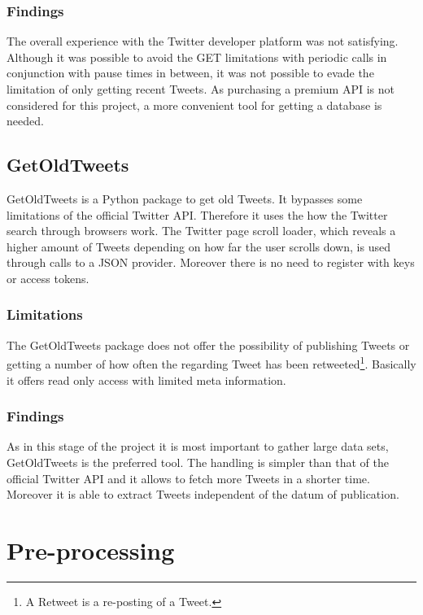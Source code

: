 \documentclass[conference]{IEEEtran}
\begin{document}
\subsubsection{Findings}

The overall experience with the Twitter developer platform was not satisfying. Although it was possible to avoid the GET limitations with periodic calls in conjunction with pause times in between, it was not possible to evade the limitation of only getting recent Tweets. As purchasing a premium API is not considered for this project, a more convenient tool for getting a database is needed.

\subsection{GetOldTweets}\label{subsec_got}

GetOldTweets \cite{got} is a Python package to get old Tweets. It bypasses some limitations of the official Twitter API. Therefore it uses the how the Twitter search through browsers work. The Twitter page scroll loader, which reveals a higher amount of Tweets depending on how far the user scrolls down, is used through calls to a JSON provider. Moreover there is no need to register with keys or access tokens.

\subsubsection{Limitations}

The GetOldTweets package does not offer the possibility of publishing Tweets or getting a number of how often the regarding Tweet has been retweeted\footnote{A Retweet is a re-posting of a Tweet.}. Basically it offers read only access with limited meta information.

\subsubsection{Findings}

As in this stage of the project it is most important to gather large data sets, GetOldTweets is the preferred tool. The handling is simpler than that of the official Twitter API and it allows to fetch more Tweets in a shorter time. Moreover it is able to extract Tweets independent of the datum of publication. 

\section{Pre-processing}
\end{document}
